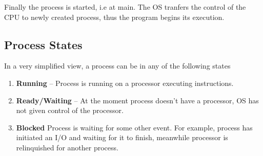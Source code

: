 \documentclass[11pt]{article}
\begin{document}
Finally the process is started, i.e at main. The OS tranfers the control of the
CPU to newly created process, thus the program begins its execution.

\subsection*{Process States}
In a very simplified view, a process can be in any of the following states
\begin{enumerate}
\item \textbf{Running} -- Process is running on a processor executing
  instructions.
\item \textbf{Ready/Waiting} -- At the moment process doesn't have a processor,
  OS has not given control of the processor.
\item \textbf{Blocked} Process is waiting for some other event. For example,
  process has initiated an I/O and waiting for it to finish, meanwhile processor
  is relinquished for another process.
\end{enumerate}

\end{document}
